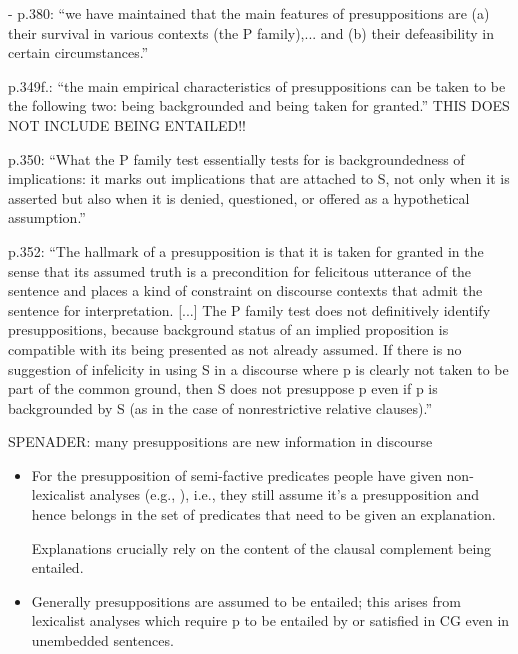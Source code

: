 \documentclass[11pt,fleqn]{article}
\newcommand{\6}{\mbox{$[\hspace*{-.6mm}[$}}
\newcommand{\9}{\mbox{$]\hspace*{-.6mm}]$}}
\begin{document}
{\begin{itemize}
- p.380: ``we have maintained that the main features of presuppositions are (a) their survival in various contexts (the P family),... and (b) their defeasibility in certain circumstances.''

p.349f.: ``the main empirical characteristics of presuppositions can be taken to be the following two: being backgrounded and being taken for granted.'' THIS DOES NOT INCLUDE BEING ENTAILED!! 

p.350: ``What the P family test essentially tests for is backgroundedness of implications: it marks out implications that are attached to S, not only when it is asserted but also when it is denied, questioned, or offered as a hypothetical assumption.''

p.352: ``The hallmark of a presupposition is that it is taken for granted in the sense that its assumed truth is a precondition for felicitous utterance of the sentence and places a kind of constraint on discourse contexts that admit the sentence for interpretation. [...] The P family test does not definitively identify presuppositions, because background status of an implied proposition is compatible with its being presented as not already assumed. If there is no suggestion of infelicity in using S in a discourse where p is clearly not taken to be part of the common ground, then S does not presuppose p even if p is backgrounded by S (as in the case of nonrestrictive relative clauses).''

SPENADER: many presuppositions are new information in discourse 


\end{itemize}

\newpage

\begin{itemize}

\item For the presupposition of semi-factive predicates people have given non-lexicalist analyses (e.g., \citealt{abrusan2011,abrusan2016,best-question}), i.e., they still assume it's a presupposition and hence belongs in the set of predicates that need to be given an explanation.

Explanations crucially rely on the content of the clausal complement being entailed.

\item Generally presuppositions are assumed to be entailed; this arises from lexicalist analyses which require p to be entailed by or satisfied in CG even in unembedded sentences.

\begin{itemize}


\end{itemize}
\end{itemize}}
\end{document}

